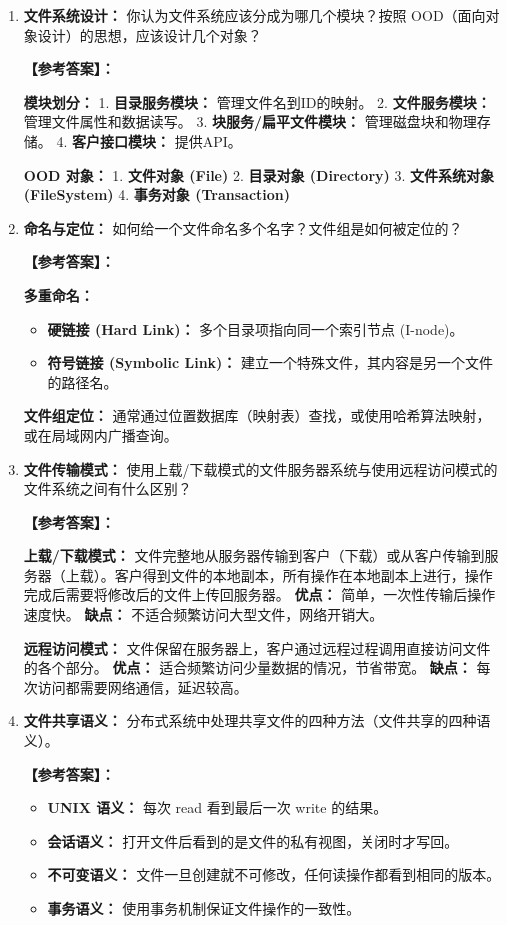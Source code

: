 \documentclass[a4paper,12pt]{article}
\newcommand{\answer}[1]{\par\vspace{0.5em}\hspace{2em}\textbf{【参考答案】：}\\{\color{blue}#1}\par\vspace{1em}}
\begin{document}
\begin{enumerate}[label=\arabic*.]
    \item \textbf{文件系统设计：}
    你认为文件系统应该分成为哪几个模块？按照 OOD（面向对象设计）的思想，应该设计几个对象？

    \answer{
    \textbf{模块划分：}
    1. \textbf{目录服务模块：} 管理文件名到ID的映射。
    2. \textbf{文件服务模块：} 管理文件属性和数据读写。
    3. \textbf{块服务/扁平文件模块：} 管理磁盘块和物理存储。
    4. \textbf{客户接口模块：} 提供API。

    \textbf{OOD 对象：}
    1. \textbf{文件对象 (File)}
    2. \textbf{目录对象 (Directory)}
    3. \textbf{文件系统对象 (FileSystem)}
    4. \textbf{事务对象 (Transaction)}
    }

    \item \textbf{命名与定位：}
    如何给一个文件命名多个名字？文件组是如何被定位的？

    \answer{
    \textbf{多重命名：}
    \begin{itemize}
        \item \textbf{硬链接 (Hard Link)：} 多个目录项指向同一个索引节点 (I-node)。
        \item \textbf{符号链接 (Symbolic Link)：} 建立一个特殊文件，其内容是另一个文件的路径名。
    \end{itemize}
    \textbf{文件组定位：} 通常通过位置数据库（映射表）查找，或使用哈希算法映射，或在局域网内广播查询。
    }

    \item \textbf{文件传输模式：}
    使用上载/下载模式的文件服务器系统与使用远程访问模式的文件系统之间有什么区别？
    
    \answer{
    \textbf{上载/下载模式：} 文件完整地从服务器传输到客户（下载）或从客户传输到服务器（上载）。客户得到文件的本地副本，所有操作在本地副本上进行，操作完成后需要将修改后的文件上传回服务器。
    \textbf{优点：} 简单，一次性传输后操作速度快。
    \textbf{缺点：} 不适合频繁访问大型文件，网络开销大。
    
    \textbf{远程访问模式：} 文件保留在服务器上，客户通过远程过程调用直接访问文件的各个部分。
    \textbf{优点：} 适合频繁访问少量数据的情况，节省带宽。
    \textbf{缺点：} 每次访问都需要网络通信，延迟较高。
    }

    \item \textbf{文件共享语义：}
    分布式系统中处理共享文件的四种方法（文件共享的四种语义）。
    
    \answer{
    \begin{itemize}
        \item \textbf{UNIX 语义：} 每次 read 看到最后一次 write 的结果。
        \item \textbf{会话语义：} 打开文件后看到的是文件的私有视图，关闭时才写回。
        \item \textbf{不可变语义：} 文件一旦创建就不可修改，任何读操作都看到相同的版本。
        \item \textbf{事务语义：} 使用事务机制保证文件操作的一致性。
    \end{itemize}
    }


\end{enumerate}
\end{document}
